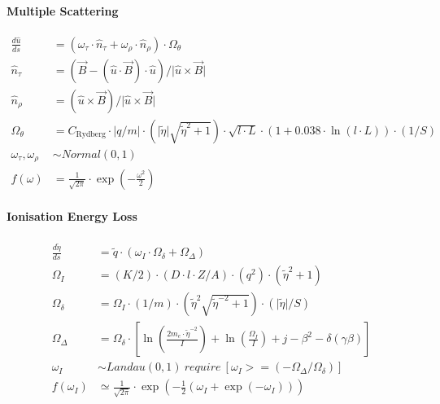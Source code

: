 \documentclass[review]{elsarticle}
\begin{document}
\paragraph{Multiple Scattering}
\begin{equation} \begin{alignedat}{-1}
    \frac{d\hat{u}}{ds}&=(\omega_{\tau}\cdot\hat{n}_{\tau}+\omega_{\rho}\cdot\hat{n}_{\rho})\cdot\Omega_{\theta} \\
    \hat{n}_{\tau}&=(\vec{B}-(\hat{u}\cdot\vec{B})\cdot\hat{u})/\bigr|\hat{u}\times\vec{B}\bigl| \\
    \hat{n}_{\rho}&=(\hat{u}\times\vec{B})/\bigr|\hat{u}\times\vec{B}\bigl| \\
    \Omega_{\theta}&=C_{\text{Rydberg}}\cdot\bigl|q/m\bigr|\cdot(\bigl|\tilde{\eta}\bigr|\sqrt{\tilde{\eta}^{2}+1})\cdot\sqrt{l\cdot L}\cdot(1+0.038\cdot\ln{(l\cdot L)})\cdot(1/S)\\
    \omega_{\tau},\omega_{\rho}&\sim Normal\left(0,1\right) \\
    f\left(\omega\right)&=\frac{1}{\sqrt{2\pi}}\cdot\exp{\left(-\frac{\omega^{2}}{2}\right)}
\end{alignedat} \end{equation} 

\paragraph{Ionisation Energy Loss}
\begin{equation} \begin{alignedat}{-1}
    \frac{d\tilde{\eta}}{ds}&=\tilde{q}\cdot\left(\omega_{I}\cdot\Omega_{\delta}+\Omega_{\Delta}\right) \\
    \Omega_{I}&=(K/2)\cdot(D\cdot l\cdot Z/A)\cdot(q^{2})\cdot(\tilde{\eta}^{2}+1) \\
    \Omega_{\delta}&=\Omega_{I}\cdot(1/m)\cdot(\tilde{\eta}^{2}\sqrt{\tilde{\eta}^{-2}+1})\cdot(\bigl|\tilde{\eta}\bigr|/S) \\
    \Omega_{\Delta}&=\Omega_{\delta}\cdot\left[\ln{\left(\frac{2m_{e}\cdot \tilde{\eta}^{-2}}{I}\right)}+\ln{\left(\frac{\Omega_{I}}{I}\right)}+j-{\beta}^{2}-\delta(\gamma\beta)\right] \\
    \omega_{I}&\sim Landau\left(0,1\right)\ require\ \left[\omega_{I}>=(-\Omega_{\Delta}/\Omega_{\delta})\right] \\
    f\left(\omega_{I}\right)&\simeq\frac{1}{\sqrt{2\pi}}\cdot\exp{\left(-\frac{1}{2}\left(\omega_{I}+\exp{(-\omega_{I})}\right)\right)}
\end{alignedat} \end{equation} 
\end{document}
